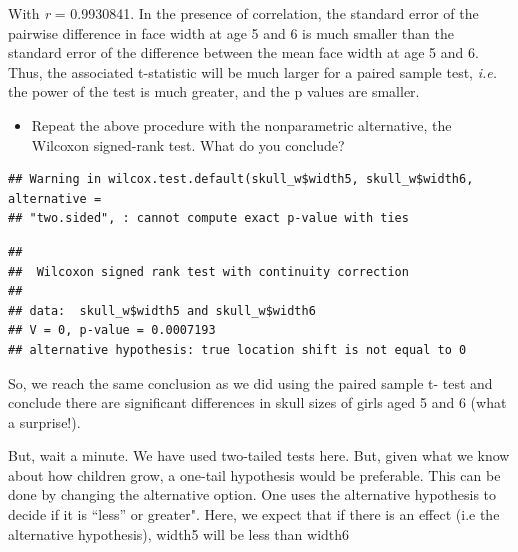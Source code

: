 \documentclass[
  12pt,
]{book}
\newenvironment{Shaded}{\begin{snugshade}}{\end{snugshade}}
\newcommand{\DataTypeTok}[1]{\textcolor[rgb]{0.13,0.29,0.53}{#1}}
\newcommand{\KeywordTok}[1]{\textcolor[rgb]{0.13,0.29,0.53}{\textbf{#1}}}
\newcommand{\NormalTok}[1]{#1}
\newcommand{\OperatorTok}[1]{\textcolor[rgb]{0.81,0.36,0.00}{\textbf{#1}}}
\newcommand{\OtherTok}[1]{\textcolor[rgb]{0.56,0.35,0.01}{#1}}
\newcommand{\StringTok}[1]{\textcolor[rgb]{0.31,0.60,0.02}{#1}}
\providecommand{\tightlist}{%
  \setlength{\itemsep}{0pt}\setlength{\parskip}{0pt}}
\begin{document}
With \emph{r} = 0.9930841. In the presence of correlation, the standard error of the pairwise difference in face width at age 5 and 6 is much smaller than the standard error of the difference between the mean face width at age 5 and 6. Thus, the associated t-statistic will be much larger for a paired sample test, \emph{i.e.} the power of the test is much greater, and the p values are smaller.

\begin{itemize}
\tightlist
\item
  Repeat the above procedure with the nonparametric alternative, the Wilcoxon signed-rank test. What do you conclude?
\end{itemize}

\begin{Shaded}
\end{Shaded}

\begin{verbatim}
## Warning in wilcox.test.default(skull_w$width5, skull_w$width6, alternative =
## "two.sided", : cannot compute exact p-value with ties
\end{verbatim}

\begin{verbatim}
## 
##  Wilcoxon signed rank test with continuity correction
## 
## data:  skull_w$width5 and skull_w$width6
## V = 0, p-value = 0.0007193
## alternative hypothesis: true location shift is not equal to 0
\end{verbatim}

So, we reach the same conclusion as we did using the paired sample t- test and conclude there are significant differences in skull sizes of girls aged 5 and 6 (what a surprise!).

But, wait a minute. We have used two-tailed tests here. But, given what we know about how children grow, a one-tail hypothesis would be preferable. This can be done by changing the alternative option. One uses the alternative hypothesis to decide if it is ``less'' or greater". Here, we expect that if there is an effect (i.e the alternative hypothesis), width5 will be less than width6

\begin{Shaded}
\end{Shaded}
\end{document}
